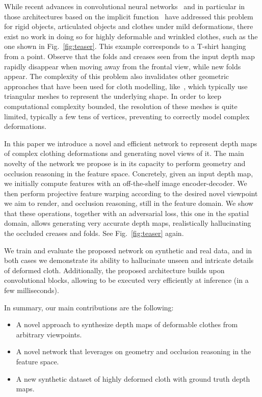 While recent advances in  convolutional neural networks~\cite{varley2017shape, zhou2020learning,haeni2020corn,yan2016perspective} and in particular in those architectures based on the   implicit function~\cite{qiang-nips-2019, chibane20ifnet} have addressed this problem for rigid objects, articulated objects and clothes under mild deformations, there exist no work in doing so for highly deformable and wrinkled clothes, such as the one shown in Fig.~\ref{fig:teaser}. This example corresponds to a T-shirt hanging from a point. Observe that the folds and creases seen from the input depth map rapidly disappear when moving away from the frontal view, while new folds appear. The complexity of this problem also invalidates other geometric approaches that have been used for cloth modelling, like~\cite{salzmann-2010, pumarola2018geometry, golyanik2018hdm, Tsoli_2019_ICCV}, which typically use triangular meshes to represent the underlying shape. In order to keep computational complexity bounded, the resolution of these meshes is quite limited, typically a few tens of vertices, preventing to correctly model complex deformations. 

In this paper we introduce a novel and efficient network to represent depth maps of complex clothing deformations and generating novel views of it. The main novelty of the  network we propose is in its capacity to  perform geometry and occlusion reasoning in the feature space. Concretely, given an input depth map, we initially compute features with an off-the-shelf image encoder-decoder. We then perform projective feature warping according to the desired novel viewpoint we aim to render, and occlusion reasoning, still in the feature domain. We show that these operations, together with an adversarial loss, this one in the spatial domain, allows generating very accurate depth maps, realistically hallucinating the occluded creases and folds. See Fig.~\ref{fig:teaser} again.

We train and evaluate  the proposed network on  synthetic and real data, and in both cases we demonstrate its ability to hallucinate unseen and intricate details of deformed cloth. Additionally, the proposed architecture builds upon convolutional blocks, allowing to be executed very efficiently at inference (in a few milliseconds). %

In summary, our main contributions are the following:
 \begin{itemize}\setlength{\itemsep}{0pt}
\item A novel approach to synthesize depth maps of deformable clothes from arbitrary viewpoints.
\item A novel network that leverages on geometry and occlusion reasoning in the feature space.
\item A new synthetic dataset of highly deformed cloth with ground truth depth maps. 
\end{itemize}

